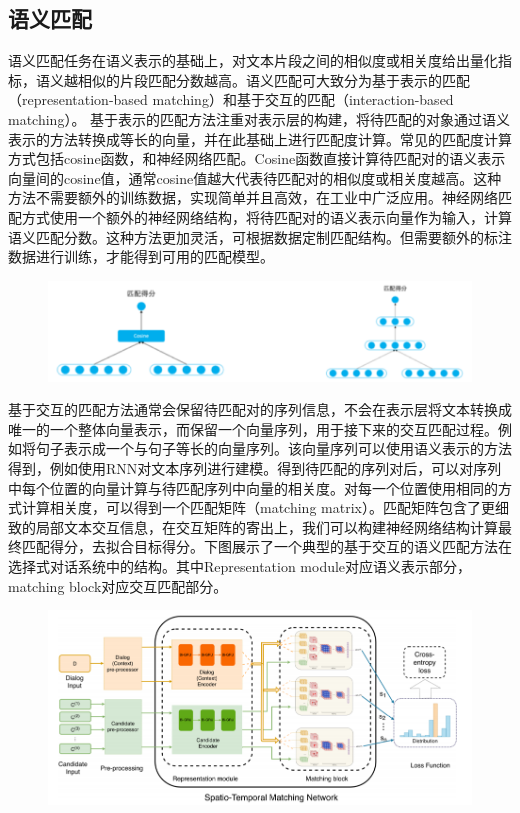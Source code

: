 \subsection{语义匹配}
语义匹配任务在语义表示的基础上，对文本片段之间的相似度或相关度给出量化指标，语义越相似的片段匹配分数越高。语义匹配可大致分为基于表示的匹配（representation-based matching）\cite{ feng2015applying}和基于交互的匹配（interaction-based matching）\cite{ zhou2018multi, luspatio}。
基于表示的匹配方法注重对表示层的构建，将待匹配的对象通过语义表示的方法转换成等长的向量，并在此基础上进行匹配度计算。常见的匹配度计算方式包括cosine函数，和神经网络匹配。Cosine函数直接计算待匹配对的语义表示向量间的cosine值，通常cosine值越大代表待匹配对的相似度或相关度越高。这种方法不需要额外的训练数据，实现简单并且高效，在工业中广泛应用。神经网络匹配方式使用一个额外的神经网络结构，将待匹配对的语义表示向量作为输入，计算语义匹配分数。这种方法更加灵活，可根据数据定制匹配结构。但需要额外的标注数据进行训练，才能得到可用的匹配模型。
\begin{figure}[h!]
\centering
\includegraphics[scale=0.8]{img/chapter_nlp/guang_match_1.png}
\label{fig:universe}
\end{figure}
基于交互的匹配方法通常会保留待匹配对的序列信息，不会在表示层将文本转换成唯一的一个整体向量表示，而保留一个向量序列，用于接下来的交互匹配过程。例如将句子表示成一个与句子等长的向量序列。该向量序列可以使用语义表示的方法得到，例如使用RNN对文本序列进行建模。得到待匹配的序列对后，可以对序列中每个位置的向量计算与待匹配序列中向量的相关度。对每一个位置使用相同的方式计算相关度，可以得到一个匹配矩阵（matching matrix）。匹配矩阵包含了更细致的局部文本交互信息，在交互矩阵的寄出上，我们可以构建神经网络结构计算最终匹配得分，去拟合目标得分。下图\cite{ luspatio}展示了一个典型的基于交互的语义匹配方法在选择式对话系统中的结构。其中Representation module对应语义表示部分，matching block对应交互匹配部分。
\begin{figure}[h!]
\centering
\includegraphics[scale=0.8]{img/chapter_nlp/guang_match_2.png}
\label{fig:universe}
\end{figure}

